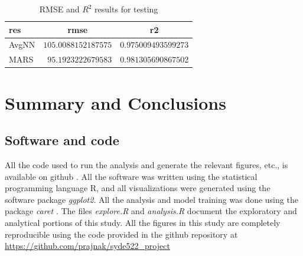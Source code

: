 \documentclass[conference]{IEEEtran}
\begin{document}
\begin{table}[!tbp]
\begin{center}
\begin{tabular}{lrr}
\hline\hline
\multicolumn{1}{l}{res}&\multicolumn{1}{c}{rmse}&\multicolumn{1}{c}{r2}\tabularnewline
\hline
AvgNN&$105.0088152187575$&$0.975009493599273$\tabularnewline
MARS&$ 95.1923222679583$&$0.981305690867502$\tabularnewline
\hline
\end{tabular}\end{center}
\caption{RMSE and $R^2$ results for testing}
\label{tab:res_test}
\end{table}

\section{Summary and Conclusions}
\subsection{Software and code}
All the code used to run the analysis and generate the relevant figures, etc., is available on github \cite{Prajna2016}. All the software was written using the statistical programming language R, and all visualizations were generated using the software package \emph{ggplot2}. All the analysis and model training was done using the package \emph{caret \cite{caret2016}}. The files \emph{explore.R} and \emph{analysis.R} document the exploratory and analytical portions of this study. All the figures in this study are completely reproducible using the code provided in the github repository at \url{https://github.com/prajnak/syde522_project}
\end{document}
